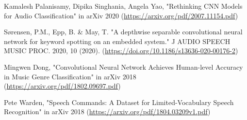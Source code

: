 \documentclass[conference]{IEEEtran}
\begin{document}
\vspace{5mm}
%
\begin{thebibliography}{00}
 Kamalesh Palanisamy, Dipika Singhania, Angela Yao, "Rethinking CNN Models for Audio Classification" in arXiv 2020  (\url{https://arxiv.org/pdf/2007.11154.pdf})

 Sørensen, P.M., Epp, B. \& May, T. "A depthwise separable convolutional neural network for keyword spotting on an embedded system." J AUDIO SPEECH MUSIC PROC. 2020, 10 (2020). (\url{https://doi.org/10.1186/s13636-020-00176-2})

 Mingwen Dong, "Convolutional Neural Network Achieves Human-level Accuracy in Music Genre Classification" in arXiv 2018  (\url{https://arxiv.org/pdf/1802.09697.pdf})

 Pete Warden, "Speech Commands: A Dataset for Limited-Vocabulary Speech Recognition" in arXiv 2018 (\url{https://arxiv.org/pdf/1804.03209v1.pdf})

\end{thebibliography}
\end{document}
